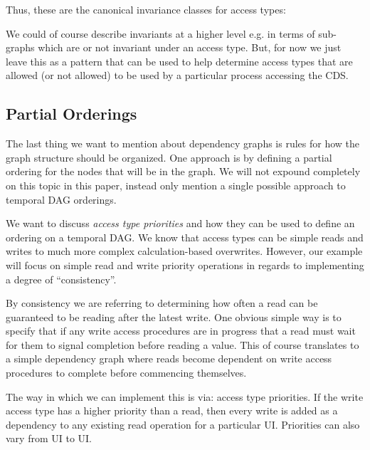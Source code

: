 Thus, these are the canonical invariance classes for access types:

\noindent{}

We could of course describe invariants at a higher level e.g. in terms of sub-graphs which are or not invariant under an access type. But, for now we just leave this as a pattern that can be used to help determine access types that are allowed (or not allowed) to be used by a particular process accessing the CDS.

\subsection{Partial Orderings}

The last thing we want to mention about dependency graphs is rules for how the graph structure should be organized. One approach is by defining a partial ordering for the nodes that will be in the graph. We will not expound completely on this topic in this paper, instead only mention a single possible approach to temporal DAG orderings.

We want to discuss \textit{access type priorities} and how they can be used to define an ordering on a temporal DAG. We know that access types can be simple reads and writes to much more complex calculation-based overwrites. However, our example will focus on simple read and write priority operations in regards to implementing a degree of ``consistency''.

By consistency we are referring to determining how often a read can be guaranteed to be reading after the latest write. One obvious simple way is to specify that if any write access procedures are in progress that a read must wait for them to signal completion before reading a value. This of course translates to a simple dependency graph where reads become dependent on write access procedures to complete before commencing themselves.

The way in which we can implement this is via: access type priorities. If the write access type has a higher priority than a read, then every write is added as a dependency to any existing read operation for a particular UI. Priorities can also vary from UI to UI.

